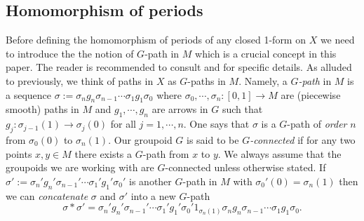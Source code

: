 \documentclass[
  a4paper, 
  reqno, 
  oneside, 
  12pt
]{amsart}
\theoremstyle{definition}
\theoremstyle{remark}
\begin{document}
\subsection{Homomorphism of periods}

Before defining the homomorphism of periods of any closed 1-form on $X$ we need to introduce the the notion of $G$-path in $M$ which is a crucial concept in this paper. The reader is recommended to consult \cite[s. 3.3]{MoMr} and \cite[c. G; s. 3]{BH} for specific details. As alluded to previously, we think of paths in $X$ as $G$-paths in $M$. Namely, a \emph{$G$-path} in $M$ is a sequence $\sigma:=\sigma_ng_n\sigma_{n-1}\cdots \sigma_1g_1\sigma_0$ where $\sigma_0,\cdots,\sigma_n:[0,1]\to M$ are (piecewise smooth) paths in $M$ and $g_1,\cdots,g_n$ are arrows in $G$ such that $g_j:\sigma_{j-1}(1)\to \sigma_{j}(0)$ for all $j=1,\cdots,n$. One says that $\sigma$ is a $G$-path of \emph{order} $n$ from $\sigma_{0}(0)$ to $\sigma_{n}(1)$. Our groupoid $G$ is said to be \emph{$G$-connected} if for any two points $x,y\in M$ there exists a $G$-path from $x$ to $y$. We always assume that the groupoids we are working with are $G$-connected unless otherwise stated. If $\sigma':=\sigma_n'g_n'\sigma_{n-1}'\cdots \sigma_1'g_1'\sigma_0'$ is another $G$-path in $M$ with $\sigma_{0}'(0)=\sigma_{n}(1)$ then we can \emph{concatenate} $\sigma$ and $\sigma'$ into a new $G$-path 
$$\sigma\ast \sigma'=\sigma_n'g_n'\sigma_{n-1}'\cdots \sigma_1'g_1'\sigma_0'1_{\sigma_{n}(1)}\sigma_ng_n\sigma_{n-1}\cdots \sigma_1g_1\sigma_0.$$
\end{document}
